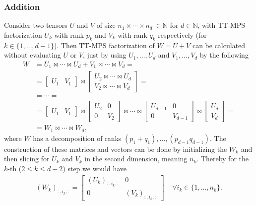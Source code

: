 \documentclass[a4paper]{article}
\begin{document}
\subsubsection{Addition}
Consider two tensors $U$ and $V$ of size $n_1 \times \cdots \times n_d \ \in
\mathbb{N}$ for $d \in \mathbb{N}$, with TT-MPS factorization $U_k$ with rank
$p_k$ and $V_k$ with rank $q_k$ respectively (for $k \in \{1, \dots ,d-1\}$).
Then TT-MPS factorization of $W = U + V$ can be calculated without
evaluating $U$ or $V$, just by using $U_1, \dots, U_{d}$ and $V_1, \dots,
V_d$ by the following
\begin{align}
    W &= U_1 \bowtie \cdots \bowtie U_d + V_1 \bowtie \cdots \bowtie V_d
    =\nonumber\\
      &= \begin{bmatrix}U_1 & V_1\end{bmatrix} \bowtie
      \begin{bmatrix} U_2 \bowtie \cdots \bowtie U_d  \\  V_2 \bowtie \cdots
      \bowtie V_d  \end{bmatrix} =\nonumber\\
      &= \cdots =\nonumber\\
      &=\begin{bmatrix}U_1 & V_1\end{bmatrix} \bowtie \begin{bmatrix} U_2 &
    0\\ 0& V_2 \end{bmatrix} \bowtie \cdots \bowtie \begin{bmatrix} U_{d-1} &
    0\\ 0& V_{d-1} \end{bmatrix} \bowtie \begin{bmatrix} U_d \\ V_d
\end{bmatrix} =\nonumber\\
        &= W_1 \bowtie \cdots \bowtie W_d,
\end{align}
where $W$ has a decomposition of ranks $(p_1 + q_1), \dots, (p_{d-1}
q_{d-1})$. The construction of these matrices and vectors can be done by
initializing the $W_k$ and then slicing for $U_k$ and $V_k$ in the second
dimension, meaning $n_k$. Thereby for the $k$-th ($2\leq k \leq d-2$) step we would have
\begin{align}
    (W_k)_{:, i_k, :} = \begin{bmatrix} (U_k)_{:, i_k, :} & 0 \\
                                        0 & (V_k)_{:, i_k, :}
                        \end{bmatrix} \;\;\;\; \forall i_k \in \{1, \dots,
                        n_k\}.
\end{align}
\end{document}
